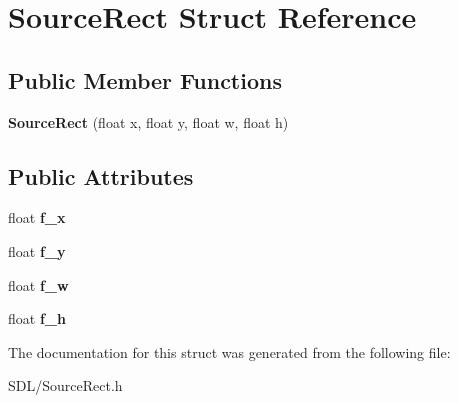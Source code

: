 \hypertarget{struct_source_rect}{\section{Source\+Rect Struct Reference}
\label{struct_source_rect}
}
\subsection*{Public Member Functions}
\begin{DoxyCompactItemize}
\item 
\hypertarget{struct_source_rect_a7995513d164246c2dd9ce6a2e07844a0}{{\bfseries Source\+Rect} (float x, float y, float w, float h)}\label{struct_source_rect_a7995513d164246c2dd9ce6a2e07844a0}

\end{DoxyCompactItemize}
\subsection*{Public Attributes}
\begin{DoxyCompactItemize}
\item 
\hypertarget{struct_source_rect_a38ea07c86b778f29111dfd40d9b5b8eb}{float {\bfseries f\+\_\+x}}\label{struct_source_rect_a38ea07c86b778f29111dfd40d9b5b8eb}

\item 
\hypertarget{struct_source_rect_a4974d7cf03d70b702a163bc4717249f3}{float {\bfseries f\+\_\+y}}\label{struct_source_rect_a4974d7cf03d70b702a163bc4717249f3}

\item 
\hypertarget{struct_source_rect_a2a62db5156f977985d9fb8c1f3ff6831}{float {\bfseries f\+\_\+w}}\label{struct_source_rect_a2a62db5156f977985d9fb8c1f3ff6831}

\item 
\hypertarget{struct_source_rect_a6b6a8ea9155360873df959a4cfb8d1fa}{float {\bfseries f\+\_\+h}}\label{struct_source_rect_a6b6a8ea9155360873df959a4cfb8d1fa}

\end{DoxyCompactItemize}


The documentation for this struct was generated from the following file\+:\begin{DoxyCompactItemize}
\item 
S\+D\+L/Source\+Rect.\+h\end{DoxyCompactItemize}
